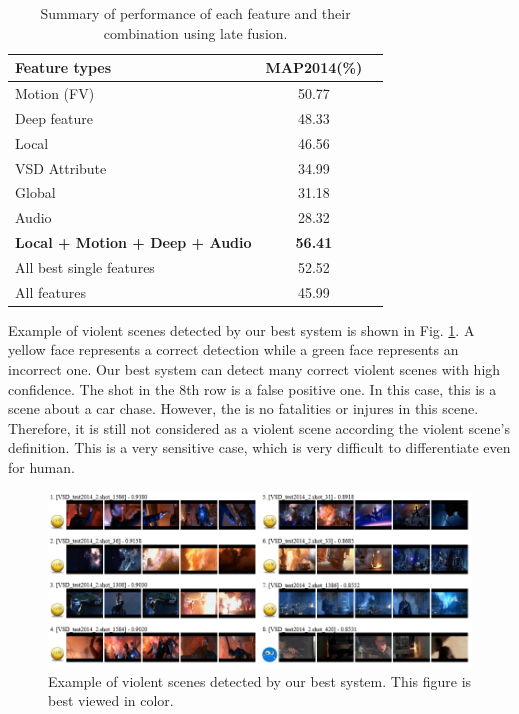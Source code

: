 \documentclass[twocolumn]{bmcart}%
\begin{document}
\begin{table}
	\centering
	\caption{Summary of performance of each feature and their combination using late fusion.}
	\begin{tabular}{lcc}
		\hline
		Feature types & MAP2014(\%) \\ \hline
		Motion (FV) & 50.77 \\
		Deep feature & 48.33 \\
		Local & 46.56 \\
		VSD Attribute & 34.99 \\
		Global & 31.18 \\
		Audio & 28.32 \\  \hline
		\textbf{Local + Motion + Deep + Audio} & \textbf{56.41} \\
		All best single features & 52.52 \\
		All features & 45.99 \\ \hline
	\end{tabular}%
	\label{tab:summary}%
\end{table}%
Example of violent scenes detected by our best system is shown in Fig. \ref{fig:bestdemo}. A yellow face represents a correct detection while a green face represents an incorrect one. Our best system can detect many correct violent scenes with high confidence. The shot in the 8th row is a false positive one. In this case, this is a scene about a car chase. However, the is no fatalities or injures in this scene. Therefore, it is still not considered as a violent scene according the violent scene's definition. This is a very sensitive case, which is very difficult to differentiate even for human. 

\begin{figure}
	\centering
	\includegraphics[width=2\linewidth]{Images/BestRun_shot8th_CarChase_NoInjure.png}
	\caption{Example of violent scenes detected by our best system. This figure is best viewed in color.}
	\label{fig:bestdemo}
\end{figure}
\end{document}
